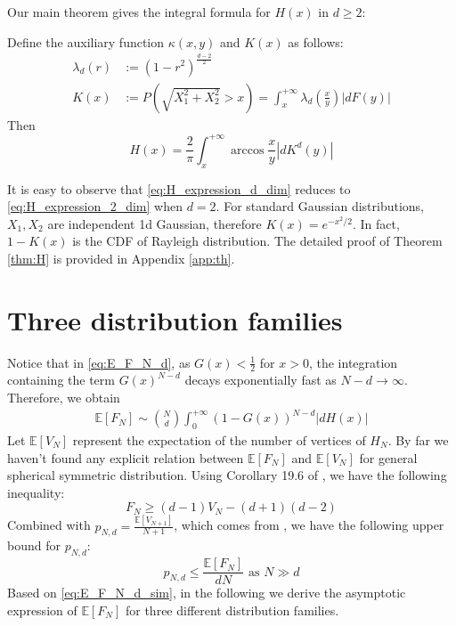 \documentclass{aptpub}
\def\E{\mathbb{E}}
\begin{document}
Our main theorem gives the integral formula for $H(x)$ in $d\geq 2$:
\begin{theorem}\label{thm:H}
Define the auxiliary function $\kappa(x,y)$ and $K(x)$ as follows: 
     \begin{align}
          \lambda_d(r) & :=(1-r^2)^{\frac{d-2}{2}}
          \label{eq:lambda_r}\\
          K(x) &:=P(\sqrt{X_1^2+X_2^2}>x)=
          \int_x^{+\infty}
          \lambda_d \left(\frac{x}{y} \right)|dF(y)|
          \label{eq:K_x}
      \end{align}
Then
\begin{equation}
     H(x) = \frac{2}{\pi}
     \int_x^{+\infty} \arccos\frac{x}{y}
     |d K^d(y)|\label{eq:H_expression_d_dim}
\end{equation}
\end{theorem}
It is easy to observe that \eqref{eq:H_expression_d_dim} reduces to 
\eqref{eq:H_expression_2_dim} when $d=2$.
For standard Gaussian distributions, $X_1, X_2$ are independent 1d
Gaussian, therefore $K(x) = e^{-x^2/2}$. In fact, $1-K(x)$ is the CDF of Rayleigh distribution.
The detailed proof of Theorem \ref{thm:H}
is provided in Appendix \ref{app:th}.

\section{Three distribution families}\label{sec:three_distriutions}
Notice that in \eqref{eq:E_F_N_d}, as $G(x)<\frac{1}{2}$ for $x>0$, the integration containing the
term $G(x)^{N-d}$ decays exponentially fast as $N-d\to \infty$.
Therefore, we obtain
\begin{align}
     \E[F_N] \sim \binom{N}{d} \int_0^{+\infty} 
      (1-G(x))^{N-d} |dH(x)| 
     \label{eq:E_F_N_d_sim}
\end{align}
Let $\E[V_N]$ represent the expectation of the number of
vertices of $H_N$.
By far we haven't found any explicit relation between $\E[F_N]$ and $\E[V_N]$
for general spherical symmetric distribution.
Using Corollary 19.6 of \cite{brondsted2012introduction}, we have the following
inequality:
\begin{equation}\label{eq:F_V_upper}
     F_N \geq (d-1) V_N - (d+1)(d-2)
 \end{equation}
Combined with $p_{N,d} = \frac{\E[V_{N+1}]}{N+1}$, which comes from
\cite{efron1965convex}, we have the following upper bound for $p_{N,d}$:
\begin{equation}
    p_{N,d} \leq \frac{\E[F_N]}{d N} \textrm{ as } N \gg d
\end{equation}
Based on \eqref{eq:E_F_N_d_sim}, in the following
we derive the asymptotic expression of $\E[F_N]$
for three different distribution families.
\end{document}

